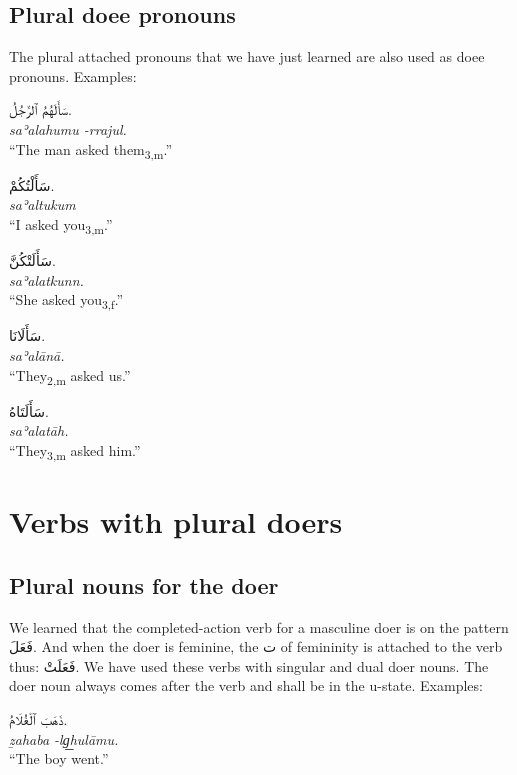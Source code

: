 \documentclass[
  10pt,
]{book}
\begin{document}
\subsection{Plural doee pronouns}\label{plural-doee-pronouns}

The plural attached pronouns that we have just learned are also used as doee pronouns.
Examples:

\foreignlanguage{arabic}{سَأَلَهُمُ ٱلرَّجُلُ.}\\
\emph{saʾalahumu -rrajul.}\\
\enquote{The man asked them\textsubscript{3,m}.}

\foreignlanguage{arabic}{سَأَلْتُکُمْ.}\\
\emph{saʾaltukum}\\
\enquote{I asked you\textsubscript{3,m}.}

\foreignlanguage{arabic}{سَأَلَتْکُنَّ.}\\
\emph{saʾalatkunn.}\\
\enquote{She asked you\textsubscript{3,f}.}

\foreignlanguage{arabic}{سَأَلَانَا.}\\
\emph{saʾalānā.}\\
\enquote{They\textsubscript{2,m} asked us.}

\foreignlanguage{arabic}{سَأَلَتَاهُ.}\\
\emph{saʾalatāh.}\\
\enquote{They\textsubscript{3,m} asked him.}

\section{Verbs with plural doers}\label{verbs-with-plural-doers}

\subsection{Plural nouns for the doer}\label{plural-nouns-for-the-doer}

We learned that the completed-action verb for a masculine doer is on the pattern \foreignlanguage{arabic}{فَعَلَ}. And when the doer is feminine, the \foreignlanguage{arabic}{ت} of femininity is attached to the verb thus: \foreignlanguage{arabic}{فَعَلَتْ}. We have used these verbs with singular and dual doer nouns. The doer noun always comes after the verb and shall be in the u-state. Examples:

\foreignlanguage{arabic}{ذَهَبَ ٱلْغُلَامُ.}\\
\emph{ẕahaba -lg͟hulāmu.}\\
\enquote{The boy went.}
\end{document}
